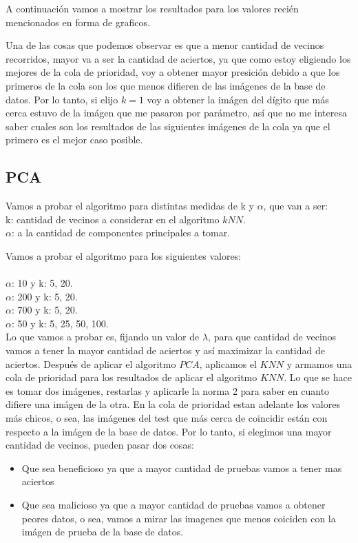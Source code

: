 A continuaci\'on vamos a mostrar los resultados para los valores reci\'en mencionados en forma de graficos.

Una de las cosas que podemos observar es que a menor cantidad de vecinos recorridos, mayor va a ser la cantidad de aciertos, ya que como estoy eligiendo los mejores de la cola de prioridad, voy a obtener mayor presici\'on debido a que los primeros de la cola son los que menos difieren de las im\'agenes de la base de datos.
Por lo tanto, si elijo $k = 1$ voy a obtener la im\'agen del d\'igito que m\'as cerca estuvo de la imágen que me pasaron por parámetro, así que no me interesa saber cuales son los resultados de las siguientes imágenes de la cola ya que el primero es el mejor caso posible.

\subsection{PCA}
Vamos a probar el algoritmo para distintas medidas de k y $\alpha$, que van a ser:\\
k: cantidad de vecinos a considerar en el algoritmo $kNN$.\\
$\alpha$: a la cantidad de componentes principales a tomar.

Vamos a probar el algoritmo para los siguientes valores:\\ \\
$\alpha$: 10  y k: 5, 20.\\
$\alpha$: 200 y k: 5, 20.\\
$\alpha$: 700 y k: 5, 20.\\
$\alpha$: 50  y k: 5, 25, 50, 100.\\

Lo que vamos a probar es, fijando un valor de $\lambda$, para que cantidad de vecinos vamos a tener la mayor cantidad de aciertos y así maximizar la cantidad de aciertos.
Después de aplicar el algoritmo $PCA$, aplicamos el $KNN$ y armamos una cola de prioridad para los resultados de aplicar el algoritmo $KNN$. Lo que se hace es tomar dos imágenes, restarlas y aplicarle la norma 2 para saber en cuanto difiere una imágen de la otra. En la cola de prioridad estan adelante los valores más chicos, o sea, las imágenes del test que más cerca de coincidir están con respecto a la imágen de la base de datos.
Por lo tanto, si elegimos una mayor cantidad de vecinos, pueden pasar dos cosas:

\begin{itemize}
  \item Que sea beneficioso ya que a mayor cantidad de pruebas vamos a tener mas aciertos
  \item Que sea malicioso ya que a mayor cantidad de pruebas vamos a obtener peores datos, o sea, vamos a mirar las imagenes que menos coiciden con la imágen de prueba de la base de datos.
\end{itemize}

